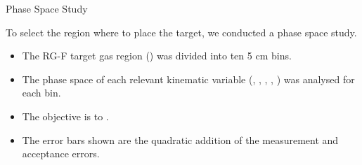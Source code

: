 \begin{frame}{Phase Space Study}
    \label{12.11::summary}

    To select the region where to place the target, we conducted a phase space study.

    \vspace{12pt}
    \begin{itemize}
        \item
            The RG-F target gas region () was divided into ten 5 cm bins.

        \vspace{6pt}
        \item
            The phase space of each relevant kinematic variable (, \ef{$\nu$}, , , ) was analysed for each bin.

        \vspace{6pt}
        \item
            The objective is to .

        \vspace{6pt}
        \item
            The error bars shown are the quadratic addition of the measurement and acceptance errors.
    \end{itemize}
\end{frame}

